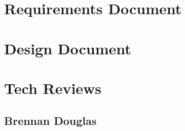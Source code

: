 \documentclass[draftclsnofoot,onecolumn,journal,letterpaper,compsoc,10pt]{IEEEtran}
\newcounter{subsubsubsection}[subsubsection]
\newcounter{subsubsubsubsection}[subsubsubsection]
\begin{document}
\section{Requirements Document}
{
    \let\section\subsubsection
    \let\subsection\subsubsubsection
    \let\subsubsection\subsubsubsubsection
    
}

\newpage
\section{Design Document}
{
    \let\section\subsubsection
    \let\subsection\subsubsubsection
    \let\subsubsection\subsubsubsubsection
    
}

\newpage
\section{Tech Reviews}

\subsection{Brennan Douglas}
{
    \let\section\subsubsection
    \let\subsection\subsubsubsection
    \let\subsubsection\subsubsubsubsection
    
}
\end{document}
